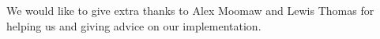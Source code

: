 We would like to give extra thanks to Alex Moomaw and Lewis Thomas for helping us and giving advice on our implementation.
